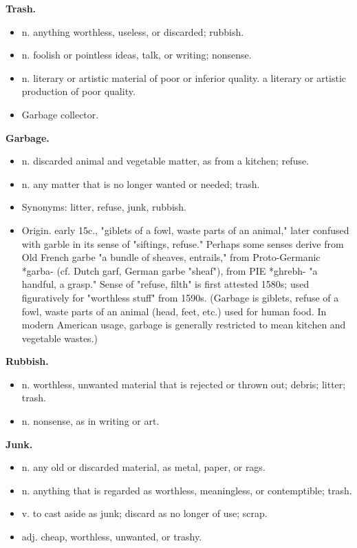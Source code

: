 \textbf{Trash.}
\begin{itemize}
\item n. anything worthless, useless, or discarded; rubbish.
\item n. foolish or pointless ideas, talk, or writing; nonsense.
\item n. literary or artistic material of poor or inferior quality. a literary or artistic production of poor quality.
\item Garbage collector.
\end{itemize}

\textbf{Garbage.}
\begin{itemize}
\item n. discarded animal and vegetable matter, as from a kitchen; refuse.
\item n. any matter that is no longer wanted or needed; trash.
\item Synonyms: litter, refuse, junk, rubbish.
\item Origin. early 15c., "giblets of a fowl, waste parts of an animal," later confused with garble in its sense of "siftings, refuse." Perhaps some senses derive from Old French garbe "a bundle of sheaves, entrails," from Proto-Germanic *garba- (cf. Dutch garf, German garbe "sheaf"), from PIE *ghrebh- "a handful, a grasp." Sense of "refuse, filth" is first attested 1580s; used figuratively for "worthless stuff" from 1590s. (Garbage is giblets, refuse of a fowl, waste parts of an animal (head, feet, etc.) used for human food. In modern American usage, garbage is generally restricted to mean kitchen and vegetable wastes.)
\end{itemize}

\textbf{Rubbish.}
\begin{itemize}
\item n. worthless, unwanted material that is rejected or thrown out; debris; litter; trash.
\item n. nonsense, as in writing or art.
\end{itemize}

\textbf{Junk.}
\begin{itemize}
\item n. any old or discarded material, as metal, paper, or rags.
\item n. anything that is regarded as worthless, meaningless, or contemptible; trash.
\item v. to cast aside as junk; discard as no longer of use; scrap.
\item adj. cheap, worthless, unwanted, or trashy.
\end{itemize}


